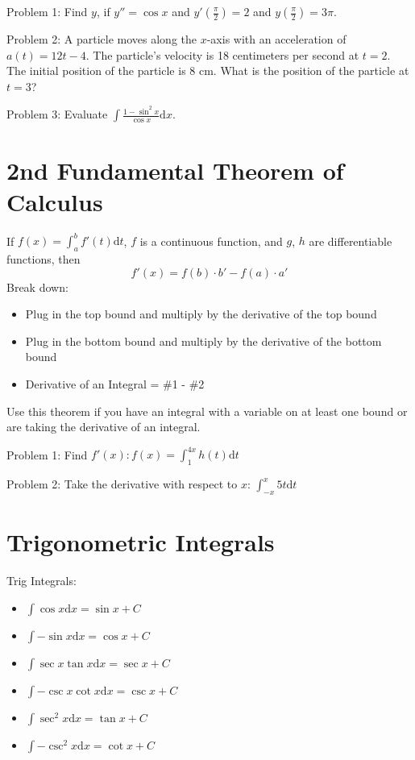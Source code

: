 \documentclass[../abcalc.tex]{subfiles}
\begin{document}
Problem 1: Find $y$, if $y'' = \cos x$ and $y'\left(\frac{\pi}{2}\right) = 2$ and $y\left(\frac{\pi}{2}\right)=3\pi$.

Problem 2: A particle moves along the $x$-axis with an acceleration of $a(t)=12t-4$. The particle's velocity is 18 centimeters per second at 
$t=2$. The initial position of the particle is 8 cm. What is the position of the particle at $t=3$?

Problem 3: Evaluate $\int \frac{1-\sin^2 x}{\cos x}\mathrm{d}x$.
\section{2nd Fundamental Theorem of Calculus}
\begin{theorem}
    If $f(x)=\int_a^b f'(t)\mathrm{d}t$, $f$ is a continuous function, and $g$, $h$ are differentiable functions, then 
    \[f'(x)=f(b)\cdot b' - f(a)\cdot a'\]
    Break down: 
    \begin{itemize}
        \item Plug in the top bound and multiply by the derivative of the top bound 
        \item Plug in the bottom bound and multiply by the derivative of the bottom bound
        \item Derivative of an Integral = \#1 - \#2 
    \end{itemize}

    Use this theorem if you have an integral with a variable on at least one bound or are taking the derivative of an integral.
\end{theorem}

Problem 1: Find $f'(x): f(x)=\int_1^{4x}h(t)\mathrm{d}t$

Problem 2: Take the derivative with respect to $x$: $\int_{-x}^x 5t\mathrm{d}t$
\section{Trigonometric Integrals}
Trig Integrals:
\begin{itemize}
    \item $\int \cos x\mathrm{d}x = \sin x + C$
    \item $\int -\sin x\mathrm{d}x = \cos x + C$
    \item $\int \sec x\tan x\mathrm{d}x = \sec x + C$
    \item $\int -\csc x\cot x\mathrm{d}x = \csc x + C$
    \item $\int \sec^2 x \mathrm{d}x = \tan x + C$
    \item $\int -\csc^2 x\mathrm{d}x = \cot x + C$
\end{itemize}
\end{document}
